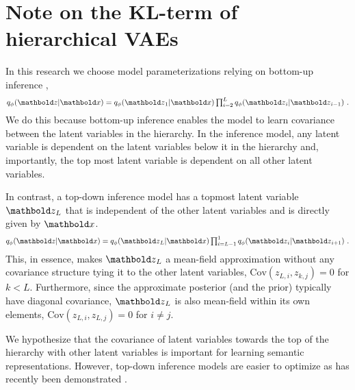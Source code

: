 {    %


\section{Note on the KL-term of hierarchical VAEs}
In this research we choose model parameterizations relying on bottom-up inference \cite{burda_importance_2016},
\begin{equation}
    q_\phi(\zb|\xb) = q_\phi(\zb_1|\xb)\textstyle\prod_{i=2}^{L} q_\phi(\zb_i|\zb_{i-1}) \ .
\end{equation}
We do this because bottom-up inference enables the model to learn covariance between the latent variables in the hierarchy.
In the inference model, any latent variable is dependent on the latent variables below it in the hierarchy and, importantly, the top most latent variable is dependent on all other latent variables.

In contrast, a top-down inference model \cite{sonderby_ladder_2016} has a topmost latent variable $\zb_L$ that is independent of the other latent variables and is directly given by $\xb$.
\begin{equation}
    q_\phi(\zb|\xb) = q_\phi(\zb_L|\xb)\textstyle\prod_{i=L-1}^{1} q_\phi(\zb_{i}|\zb_{i+1}) \ .
\end{equation}
This, in essence, makes $\zb_L$ a mean-field approximation without any covariance structure tying it to the other latent variables, $\text{Cov}(z_{L,i}, z_{k,j})=0$ for $k<L$.
Furthermore, since the approximate posterior (and the prior) typically have diagonal covariance, $\zb_L$ is also mean-field within its own elements, $\text{Cov}(z_{L,i}, z_{L,j})=0$ for $i\ne j$.

We hypothesize that the covariance of latent variables towards the top of the hierarchy with other latent variables is important for learning semantic representations.
However, top-down inference models are easier to optimize as has recently been demonstrated \cite{sonderby_ladder_2016, vahdat_nvae_2020, child_very_2021}.

}
